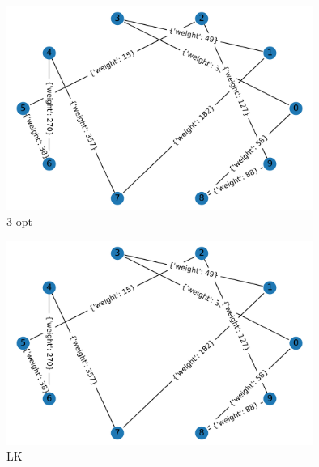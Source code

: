 \documentclass[8pt]{beamer}
\begin{document}
\begin{frame}
  \begin{figure}
  \includegraphics[width=10cm]{primeri/primer2_3opt.png}
 	\caption{3-opt}
	\label{Slika 7}
	\end{figure}
\end{frame}

\begin{frame}
\begin{figure}
  \includegraphics[width=10cm]{primeri/primer2_lk.png}
\caption{LK}
\label{Slika 8}
\end{figure}
\end{frame}
\end{document}
